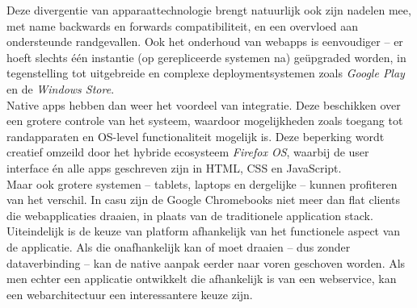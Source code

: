\documentclass[10pt,a4paper]{article}
\begin{document}
		Deze divergentie van apparaattechnologie brengt natuurlijk ook zijn nadelen mee, met name backwards en forwards compatibiliteit, en een overvloed aan ondersteunde randgevallen. Ook het onderhoud van webapps is eenvoudiger -- er hoeft slechts \'e\'en instantie (op gerepliceerde systemen na) ge\"upgraded worden, in tegenstelling tot uitgebreide en complexe deploymentsystemen zoals \textit{Google Play} en de \textit{Windows Store}.\\

		Native apps hebben dan weer het voordeel van integratie. Deze beschikken over een grotere controle van het systeem, waardoor mogelijkheden zoals toegang tot randapparaten en OS-level functionaliteit mogelijk is. Deze beperking wordt creatief omzeild door het hybride ecosysteem \textit{Firefox OS}, waarbij de user interface \'en alle apps geschreven zijn in HTML, CSS en JavaScript.\\

		\noindent Maar ook grotere systemen -- tablets, laptops en dergelijke -- kunnen profiteren van het verschil. In casu zijn de Google Chromebooks niet meer dan flat clients die webapplicaties draaien, in plaats van de traditionele application stack.\\

		\noindent Uiteindelijk is de keuze van platform afhankelijk van het functionele aspect van de applicatie. Als die onafhankelijk kan of moet draaien -- dus zonder dataverbinding -- kan de native aanpak eerder naar voren geschoven worden. Als men echter een applicatie ontwikkelt die afhankelijk is van een webservice, kan een webarchitectuur een interessantere keuze zijn.

\end{document}
